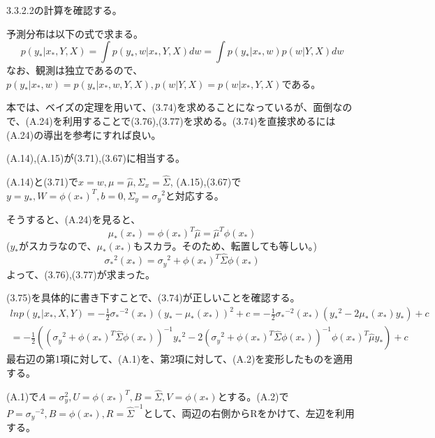 \documentclass{jsarticle}
\begin{document}
3.3.2.2の計算を確認する。

予測分布は以下の式で求まる。
\begin{equation}
p(y_* | x_*, Y, X) = \int p(y_*, w | x_*, Y, X) dw = \int p(y_* | x_*, w)p(w | Y, X) dw
\end{equation}
なお、観測は独立であるので、$p(y_* | x_*, w) = p(y_* | x_*, w, Y, X), p(w | Y, X) = p(w | x_*, Y, X)$である。

本では、ベイズの定理を用いて、(3.74)を求めることになっているが、面倒なので、(A.24)を利用することで(3.76),(3.77)を求める。(3.74)を直接求めるには(A.24)の導出を参考にすれば良い。

(A.14),(A.15)が(3.71),(3.67)に相当する。

(A.14)と(3.71)で$x = w, \mu = \hat{\mu}, \Sigma_x = \hat{\Sigma}$, (A.15),(3.67)で$y = y_*, W = {\phi(x_*)}^T, b = 0, \Sigma_y = {\sigma_y}^2$と対応する。

そうすると、(A.24)を見ると、
\begin{equation}
\mu_*(x_*) = {\phi(x_*)}^T \hat{\mu} = {\hat{\mu}}^T \phi(x_*)
\end{equation}
($y_*$がスカラなので、$\mu_*(x_*)$もスカラ。そのため、転置しても等しい。)
\begin{equation}
{\sigma_*}^2(x_*) = {\sigma_y}^2 + {\phi(x_*)}^T \hat{\Sigma} \phi(x_*)
\end{equation}
よって、(3.76),(3.77)が求まった。

(3.75)を具体的に書き下すことで、(3.74)が正しいことを確認する。
\begin{equation}
\begin{split}
ln p(y_* | x_*, X, Y) = -\frac{1}{2}{\sigma_*}^{-2}(x_*)(y_* - \mu_*(x_*))^2 + c
= -\frac{1}{2}{\sigma_*}^{-2}(x_*)({y_*}^2 - 2\mu_*(x_*) y_*) + c\\
= -\frac{1}{2}(({\sigma_y}^2 + {\phi(x_*)}^T \hat{\Sigma} \phi(x_*))^{-1}{y_*}^2 - 2({\sigma_y}^2 + {\phi(x_*)}^T \hat{\Sigma} \phi(x_*))^{-1} {\phi(x_*)}^T \hat{\mu} y_*) + c
\end{split}
\end{equation}
最右辺の第1項に対して、(A.1)を、第2項に対して、(A.2)を変形したものを適用する。

(A.1)で$A=\sigma_y^2, U = {\phi(x_*)}^T, B = \hat{\Sigma}, V = \phi(x_*)$とする。(A.2)で$P={\sigma_y}^{-2}, B = \phi(x_*), R = {\hat{\Sigma}}^{-1}$として、両辺の右側からRをかけて、左辺を利用する。
\end{document}
